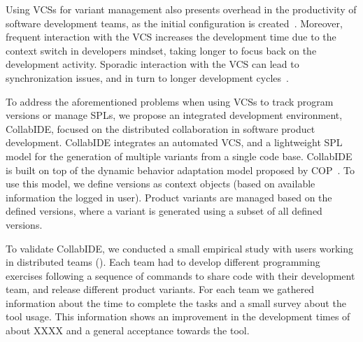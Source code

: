 Using \acp{VCS} for variant management also presents overhead in the productivity of software development teams, as the initial configuration is created~\cite{niu14}.
Moreover, frequent interaction with the \ac{VCS} increases the development time due to the context switch in developers mindset, taking longer to focus back on the development activity. Sporadic interaction with the \ac{VCS} can lead to synchronization issues, and in turn to longer development cycles~\cite{schwagerl15}.  

To address the aforementioned problems when using \acp{VCS} to track program versions or manage \acp{SPL}, we propose an integrated development environment, CollabIDE, focused on the distributed  collaboration in software product development. CollabIDE integrates an automated \ac{VCS}, and a lightweight \ac{SPL} model for the generation of multiple variants from a single code base. 
CollabIDE is built on top of the dynamic behavior adaptation model proposed by \ac{COP}~\cite{salvaneschi+12survey}. To use this model, we define versions as context objects (based on available information \eg the logged in user).
Product variants are managed based on the defined versions, where a variant is generated using a subset of all defined versions.

To validate CollabIDE, we conducted a small empirical study with users 
working in distributed teams (). Each team had to develop different programming exercises following a sequence of commands to share code with their development team, and release different product variants. For each team we gathered information about the time to complete the tasks and a small survey about the tool usage. This information shows an improvement in the development times of about XXXX and a general acceptance towards the tool.
 



\endinput

With CollabIDE, we aim to solve the overhead problems that exists in these development models with 
features that aim to reduce the time developers must spend doing actions related to version control or 
setting up a project that uses \acp{SPL}.

